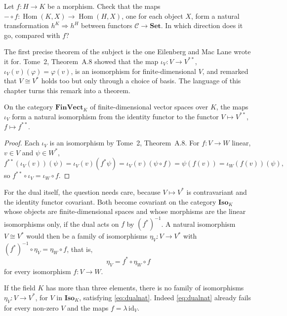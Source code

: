 \begin{think}
Let $f\colon H\to K$ be a morphism. Check that the maps $-\circ f\colon\operatorname{Hom}(K,X)\to\operatorname{Hom}(H,X)$, one for each object $X$, form a natural transformation $h^K\Rightarrow h^H$ between functors
$\mathcal C\to\mathbf{Set}$. In which direction does it go, compared with $f$?
\end{think}

The first precise theorem of the subject is the one Eilenberg and Mac Lane wrote it for. Tome~2, Theorem~A.8 showed that the map $\iota_V\colon V\to V^{**}$, $\iota_V(v)(\varphi)=\varphi(v)$,
is an isomorphism for finite-dimensional $V$, and remarked that $V\cong V^*$ holds too but only through a choice of basis. The language of this chapter turns this remark into a theorem.

\begin{theorem}\label{thm:bidualnat}
On the category $\mathbf{FinVect}_K$ of finite-dimensional vector spaces over $K$, the maps $\iota_V$ form a natural isomorphism from the identity functor to the functor $V\mapsto V^{**}$,
$f\mapsto f^{**}$.
\end{theorem}

\begin{proof}
Each $\iota_V$ is an isomorphism by Tome~2, Theorem~A.8. For $f\colon V\to W$ linear, $v\in V$ and $\psi\in W^*$,
\[f^{**}(\iota_V(v))(\psi)=\iota_V(v)(f^*\psi)=\iota_V(v)(\psi\circ f)=\psi(f(v))=\iota_W(f(v))(\psi),\]
so $f^{**}\circ\iota_V=\iota_W\circ f$.
\end{proof}

For the dual itself, the question needs care, because $V\mapsto V^*$ is contravariant and the identity functor covariant. Both become covariant on the category $\mathbf{Iso}_K$ whose objects are
finite-dimensional spaces and whose morphisms are the linear isomorphisms only, if the dual acts on $f$ by $(f^*)^{-1}$. A natural isomorphism $V\cong V^*$ would then be a family of
isomorphisms $\eta_V\colon V\to V^*$ with $(f^*)^{-1}\circ\eta_V=\eta_W\circ f$, that is,
\begin{equation}\label{eq:dualnat}
\eta_V=f^*\circ\eta_W\circ f
\end{equation}
for every isomorphism $f\colon V\to W$.

\begin{theorem}\label{thm:notnatural}
If the field $K$ has more than three elements, there is no family of isomorphisms $\eta_V\colon V\to V^*$, for $V$ in $\mathbf{Iso}_K$, satisfying \eqref{eq:dualnat}. Indeed \eqref{eq:dualnat} already fails
for every non-zero $V$ and the maps $f=\lambda\,\mathrm{id}_V$.
\end{theorem}

